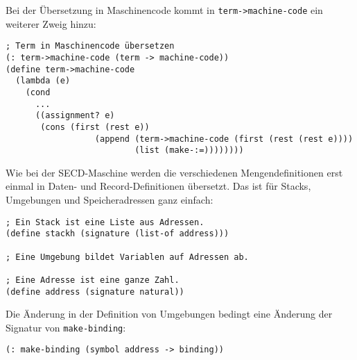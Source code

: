 Bei der Übersetzung in Maschinencode kommt in
\texttt{term->machine-code} ein weiterer Zweig hinzu:
%
\begin{verbatim}
; Term in Maschinencode übersetzen
(: term->machine-code (term -> machine-code))
(define term->machine-code
  (lambda (e)
    (cond
      ...
      ((assignment? e)
       (cons (first (rest e))
                  (append (term->machine-code (first (rest (rest e))))
                          (list (make-:=))))))))
\end{verbatim}
%
Wie bei der SECD-Maschine werden die verschiedenen Mengendefinitionen
erst einmal in Daten- und Record-Definitionen übersetzt.  Das ist für
Stacks, Umgebungen und Speicheradressen ganz einfach:
%
\begin{verbatim}
; Ein Stack ist eine Liste aus Adressen.
(define stackh (signature (list-of address)))

; Eine Umgebung bildet Variablen auf Adressen ab.

; Eine Adresse ist eine ganze Zahl.
(define address (signature natural))
\end{verbatim}
%
Die Änderung in der Definition von Umgebungen bedingt eine Änderung
der Signatur von \texttt{make-binding}:
%
\begin{verbatim}
(: make-binding (symbol address -> binding))
\end{verbatim}

